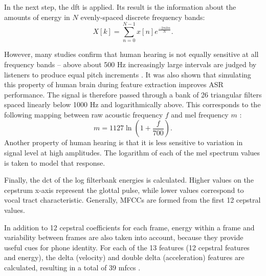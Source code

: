 In the next step, the \gls{dft} is applied. Its result is the information about the amounts of energy in $N$ evenly-spaced discrete frequency bands:
\begin{equation}
  X[k]=\sum_{n=0}^{N-1}x[n]e^{\frac{-2\pi ikn}{N}}.
\end{equation}

However, many studies confirm that human hearing is not equally sensitive at all frequency bands -- above about 500 Hz increasingly large intervals are judged by listeners to produce equal pitch increments \cite{stevens1937scale, fletcher1938loudness}. It was also shown that simulating this property of human brain during feature extraction improves ASR performance. The signal is therefore passed through a bank of 26 triangular filters spaced linearly below 1000 Hz and logarithmically above. This corresponds to the following mapping between raw acoustic frequency $f$ and mel frequency $m$ \cite{muda2010voice}:
\begin{equation}
  m=1127\ln(1+\frac{f}{700}).
\end{equation}
Another property of human hearing is that it is less sensitive to variation in signal level at high amplitudes. The logarithm of each of the mel spectrum values is taken to model that response.

Finally, the \gls{dct} of the log filterbank energies is calculated. Higher values on the cepstrum x-axis represent the glottal pulse, while lower values correspond to vocal tract characteristic. Generally, MFCCs are formed from the first 12 cepstral values.

In addition to 12 cepstral coefficients for each frame, energy within a frame and variability between frames are also taken into account, because they provide useful cues for phone identity. For each of the 13 features (12 cepstral features and energy), the delta (velocity) and double delta (acceleration) features are calculated, resulting in a total of 39 \glspl{mfcc} \cite{jurafsky2000speech}.


